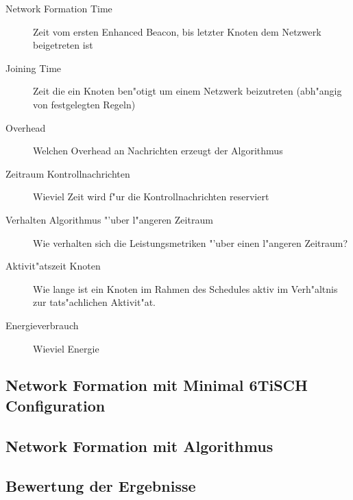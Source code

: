 \begin{description}
  \item [Network Formation Time] Zeit vom ersten Enhanced Beacon, bis letzter
  Knoten dem Netzwerk beigetreten ist
  \item [Joining Time] Zeit die ein Knoten ben"otigt um einem Netzwerk beizutreten
  (abh"angig von festgelegten Regeln)
  \item [Overhead] Welchen Overhead an Nachrichten erzeugt der Algorithmus
  \item [Zeitraum Kontrollnachrichten] Wieviel Zeit wird f"ur die Kontrollnachrichten
  reserviert
  \item [Verhalten Algorithmus "'uber l"angeren Zeitraum] Wie verhalten sich die Leistungsmetriken
  "'uber einen l"angeren Zeitraum?
  \item [Aktivit"atszeit Knoten] Wie lange ist ein Knoten im Rahmen des Schedules aktiv
  im Verh"altnis zur tats"achlichen Aktivit"at.
  \item [Energieverbrauch] Wieviel Energie
\end{description}

\subsection{Network Formation mit Minimal 6TiSCH Configuration}
\label{subsec:ae_6tisch}

\subsection{Network Formation mit Algorithmus}
\label{subsec:ae_algorithmus}

\subsection{Bewertung der Ergebnisse}
\label{subsec:ae_bewertung}
